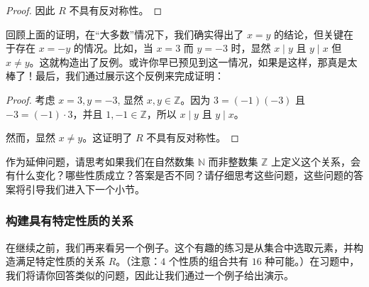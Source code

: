 \begin{example}
\begin{itemize}
\begin{proof}
            因此 $R$ 不具有反对称性。
        \end{proof}

        回顾上面的证明，在``大多数''情况下，我们确实得出了 $x = y$ 的结论，但关键在于存在 $x = -y$ 的情况。比如，当 $x = 3$ 而 $y = -3$ 时，显然 $x \mid y$ 且 $y \mid x$ 但 $x \ne y$。这就构造出了反例。或许你早已预见到这一情况，如果是这样，那真是太棒了！最后，我们通过展示这个反例来完成证明：
        \begin{proof}
            考虑 $x=3, y=-3$, 显然 $x, y \in \mathbb{Z}$。因为 $3 = (-1)(-3)$ 且 $-3 = (-1) \cdot 3$，并且 $1, -1 \in \mathbb{Z}$，所以 $x \mid y$ 且 $y \mid x$。

            然而，显然 $x \ne y$。这证明了 $R$ 不具有反对称性。
        \end{proof}
    \end{itemize}
\end{example}

作为延伸问题，请思考如果我们在自然数集 $\mathbb{N}$ 而非整数集 $\mathbb{Z}$ 上定义这个关系，会有什么变化？哪些性质成立？答案是否不同？请仔细思考这些问题，这些问题的答案将引导我们进入下一个小节。

\subsubsection*{构建具有特定性质的关系}

在继续之前，我们再来看另一个例子。这个有趣的练习是从集合中选取元素，并构造满足特定性质的关系 $R$。（注意：$4$ 个性质的组合共有 $16$ 种可能。）在习题中，我们将请你回答类似的问题，因此让我们通过一个例子给出演示。

